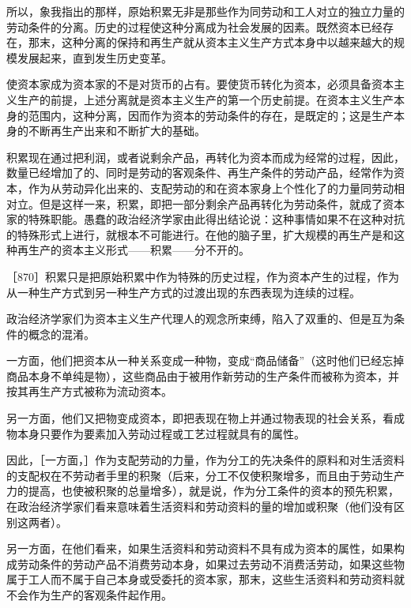 所以，象我指出的那样，原始积累无非是那些作为同劳动和工人对立的独立力量的劳动条件的分离。历史的过程使这种分离成为社会发展的因素。既然资本已经存在，那末，这种分离的保持和再生产就从资本主义生产方式本身中以越来越大的规模发展起来，直到发生历史变革。

使资本家成为资本家的不是对货币的占有。要使货币转化为资本，必须具备资本主义生产的前提，上述分离就是资本主义生产的第一个历史前提。在资本主义生产本身的范围内，这种分离，因而作为资本的劳动条件的存在，是既定的；这是生产本身的不断再生产出来和不断扩大的基础。

积累现在通过把利润，或者说剩余产品，再转化为资本而成为经常的过程，因此，数量已经增加了的、同时是劳动的客观条件、再生产条件的劳动产品，经常作为资本，作为从劳动异化出来的、支配劳动的和在资本家身上个性化了的力量同劳动相对立。但是这样一来，积累，即把一部分剩余产品再转化为劳动条件，就成了资本家的特殊职能。愚蠢的政治经济学家由此得出结论说：这种事情如果不在这种对抗的特殊形式上进行，就根本不可能进行。在他的脑子里，扩大规模的再生产是和这种再生产的资本主义形式——积累——分不开的。

［870］积累只是把原始积累中作为特殊的历史过程，作为资本产生的过程，作为从一种生产方式到另一种生产方式的过渡出现的东西表现为连续的过程。

政治经济学家们为资本主义生产代理人的观念所束缚，陷入了双重的、但是互为条件的概念的混淆。

一方面，他们把资本从一种关系变成一种物，变成“商品储备”（这时他们已经忘掉商品本身不单纯是物），这些商品由于被用作新劳动的生产条件而被称为资本，并按其再生产方式被称为流动资本。

另一方面，他们又把物变成资本，即把表现在物上并通过物表现的社会关系，看成物本身只要作为要素加入劳动过程或工艺过程就具有的属性。

因此，［一方面，］作为支配劳动的力量，作为分工的先决条件的原料和对生活资料的支配权在不劳动者手里的积聚（后来，分工不仅使积聚增多，而且由于劳动生产力的提高，也使被积聚的总量增多），就是说，作为分工条件的资本的预先积累，在政治经济学家们看来意味着生活资料和劳动资料的量的增加或积聚（他们没有区别这两者）。

另一方面，在他们看来，如果生活资料和劳动资料不具有成为资本的属性，如果构成劳动条件的劳动产品不消费劳动本身，如果过去劳动不消费活劳动，如果这些物属于工人而不属于自己本身或受委托的资本家，那末，这些生活资料和劳动资料就不会作为生产的客观条件起作用。

